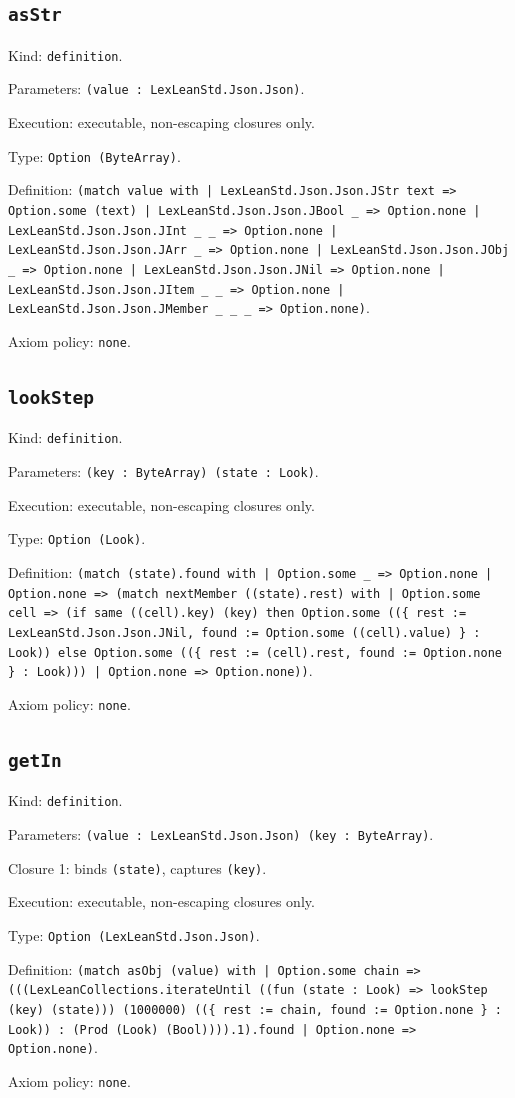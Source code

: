 \documentclass[11pt]{article}
\begin{document}
\subsection*{\texttt{asStr}}
\noindent Kind: \texttt{definition}.\par
\noindent Parameters: \texttt{(value : LexLeanStd.Json.Json)}.\par
\noindent Execution: executable, non-escaping closures only.\par
\noindent Type: \texttt{Option (ByteArray)}.\par
\noindent Definition: \texttt{(match value with | LexLeanStd.Json.Json.JStr text => Option.some (text) | LexLeanStd.Json.Json.JBool \_ => Option.none | LexLeanStd.Json.Json.JInt \_ \_ => Option.none | LexLeanStd.Json.Json.JArr \_ => Option.none | LexLeanStd.Json.Json.JObj \_ => Option.none | LexLeanStd.Json.Json.JNil => Option.none | LexLeanStd.Json.Json.JItem \_ \_ => Option.none | LexLeanStd.Json.Json.JMember \_ \_ \_ => Option.none)}.\par
\noindent Axiom policy: \texttt{none}.\par
\subsection*{\texttt{lookStep}}
\noindent Kind: \texttt{definition}.\par
\noindent Parameters: \texttt{(key : ByteArray) (state : Look)}.\par
\noindent Execution: executable, non-escaping closures only.\par
\noindent Type: \texttt{Option (Look)}.\par
\noindent Definition: \texttt{(match (state).found with | Option.some \_ => Option.none | Option.none => (match nextMember ((state).rest) with | Option.some cell => (if same ((cell).key) (key) then Option.some ((\{ rest := LexLeanStd.Json.Json.JNil, found := Option.some ((cell).value) \} : Look)) else Option.some ((\{ rest := (cell).rest, found := Option.none \} : Look))) | Option.none => Option.none))}.\par
\noindent Axiom policy: \texttt{none}.\par
\subsection*{\texttt{getIn}}
\noindent Kind: \texttt{definition}.\par
\noindent Parameters: \texttt{(value : LexLeanStd.Json.Json) (key : ByteArray)}.\par
\noindent Closure 1: binds \texttt{(state)}, captures \texttt{(key)}.\par
\noindent Execution: executable, non-escaping closures only.\par
\noindent Type: \texttt{Option (LexLeanStd.Json.Json)}.\par
\noindent Definition: \texttt{(match asObj (value) with | Option.some chain => (((LexLeanCollections.iterateUntil ((fun (state : Look) => lookStep (key) (state))) (1000000) ((\{ rest := chain, found := Option.none \} : Look)) : (Prod (Look) (Bool)))).1).found | Option.none => Option.none)}.\par
\noindent Axiom policy: \texttt{none}.\par
\end{document}
